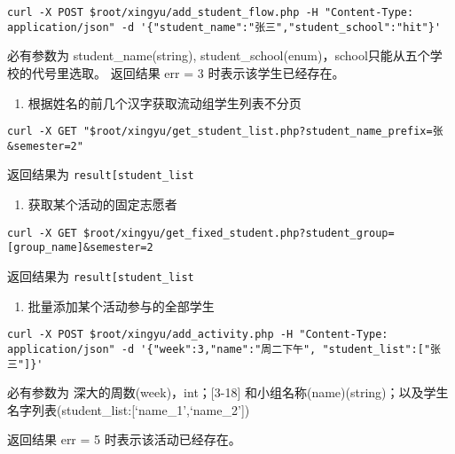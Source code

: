 \documentclass[]{article}
\providecommand{\tightlist}{%
  \setlength{\itemsep}{0pt}\setlength{\parskip}{0pt}}
\begin{document}
\begin{verbatim}
curl -X POST $root/xingyu/add_student_flow.php -H "Content-Type: application/json" -d '{"student_name":"张三","student_school":"hit"}'
\end{verbatim}

必有参数为 student\_name(string),
student\_school(enum)，school只能从五个学校的代号里选取。 返回结果 err =
3 时表示该学生已经存在。

\begin{enumerate}
\def\labelenumi{\arabic{enumi}.}
\setcounter{enumi}{1}
\tightlist
\item
  根据姓名的前几个汉字获取流动组学生列表不分页
\end{enumerate}

\begin{verbatim}
curl -X GET "$root/xingyu/get_student_list.php?student_name_prefix=张&semester=2"
\end{verbatim}

返回结果为
\texttt{result{[}\textquotesingle{}student\_list\textquotesingle{}{]}}

\begin{enumerate}
\def\labelenumi{\arabic{enumi}.}
\setcounter{enumi}{2}
\tightlist
\item
  获取某个活动的固定志愿者
\end{enumerate}

\begin{verbatim}
curl -X GET $root/xingyu/get_fixed_student.php?student_group=[group_name]&semester=2
\end{verbatim}

返回结果为
\texttt{result{[}\textquotesingle{}student\_list\textquotesingle{}{]}}

\begin{enumerate}
\def\labelenumi{\arabic{enumi}.}
\setcounter{enumi}{3}
\tightlist
\item
  批量添加某个活动参与的全部学生
\end{enumerate}

\begin{verbatim}
curl -X POST $root/xingyu/add_activity.php -H "Content-Type: application/json" -d '{"week":3,"name":"周二下午", "student_list":["张三"]}'
\end{verbatim}

必有参数为 深大的周数(week)，int；{[}3-18{]}
和小组名称(name)(string)；以及学生名字列表(student\_list:{[}`name\_1',`name\_2'{]})

返回结果 err = 5 时表示该活动已经存在。
\end{document}
